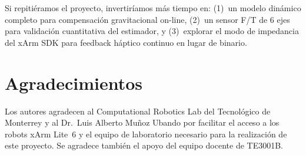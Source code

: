 \documentclass[journal,10pt,twoside]{IEEEtran}
\begin{document}
Si repitiéramos el proyecto, invertiríamos más tiempo en: (1)~un
modelo dinámico completo para compensación gravitacional on-line,
(2)~un sensor F/T de 6 ejes para validación cuantitativa del estimador,
y (3)~explorar el modo de impedancia del xArm SDK para feedback
háptico continuo en lugar de binario.

\section*{Agradecimientos}

Los autores agradecen al Computational Robotics Lab del Tecnológico
de Monterrey y al Dr.\ Luis Alberto Muñoz Ubando por facilitar el
acceso a los robots xArm Lite~6 y el equipo de laboratorio necesario
para la realización de este proyecto. Se agradece también el apoyo
del equipo docente de TE3001B.
\end{document}
